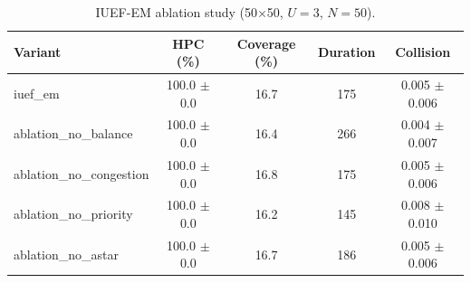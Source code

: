 \begin{table}[t]
\centering
\caption{IUEF-EM ablation study (50$\times$50, $U{=}3$, $N{=}50$).}
\begin{tabular}{lcccc}
\hline
Variant & HPC (\%) & Coverage (\%) & Duration & Collision \\
\hline
iuef\_em & 100.0 $\pm$ 0.0 & 16.7 & 175 & 0.005 $\pm$ 0.006 \\
ablation\_no\_balance & 100.0 $\pm$ 0.0 & 16.4 & 266 & 0.004 $\pm$ 0.007 \\
ablation\_no\_congestion & 100.0 $\pm$ 0.0 & 16.8 & 175 & 0.005 $\pm$ 0.006 \\
ablation\_no\_priority & 100.0 $\pm$ 0.0 & 16.2 & 145 & 0.008 $\pm$ 0.010 \\
ablation\_no\_astar & 100.0 $\pm$ 0.0 & 16.7 & 186 & 0.005 $\pm$ 0.006 \\
\hline
\end{tabular}
\end{table}
